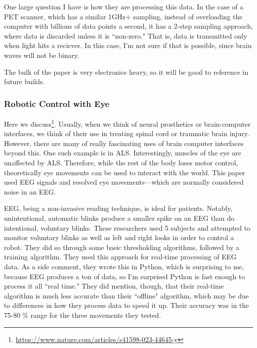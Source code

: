 \documentclass[12pt]{report}
\begin{document}
One large question I have is how they are processing this data. In the case of a PET scanner, which has a similar 1GHz+ sampling, instead of overloading the computer with billions of data points a second, it has a 2-step sampling approach, where data is discarded unless it is ``non-zero." That is, data is transmitted only when light hits a reciever. In this case, I'm not sure if that is possible, since brain waves will not be binary.\newline

The bulk of the paper is very electronics heavy, so it will be good to reference in future builds. 


\subsubsection{Robotic Control with Eye}

Here we discuss\footnote{\url{https://www.nature.com/articles/s41598-023-44645-y}}. Usually, when we think of neural prosthetics or brain-computer interfaces, we think of their use in treating spinal cord or traumatic brain injury. However, there are many of really fascinating uses of brain computer interfaces beyond this. One such example is in ALS. Interestingly, muscles of the eye are unaffected by ALS. Therefore, while the rest of the body loses motor control, theoretically eye movements can be used to interact with the world. This paper used EEG signals and resolved eye movements---which are normally considered noise in an EEG.\newline

EEG, being a non-invasive reading technique, is ideal for patients. Notably, unintentional, automatic blinks produce a smaller spike on an EEG than do intentional, voluntary blinks. These researchers used 5 subjects and attempted to monitor voluntary blinks as well as left and right looks in order to control a robot. They did so through some basic thresholding algorithms, followed by a training algorithm. They used this approach for real-time processing of EEG data. As a side comment, they wrote this in Python, which is surprising to me, because EEG produces a ton of data, so I'm surprised Python is fast enough to process it all ``real time." They did mention, though, that their real-time algorithm is much less accurate than their ``offline" algorithm, which may be due to differences in how they process data to speed it up. Their accuracy was in the 75-80 \% range for the three movements they tested.\newline
\end{document}
